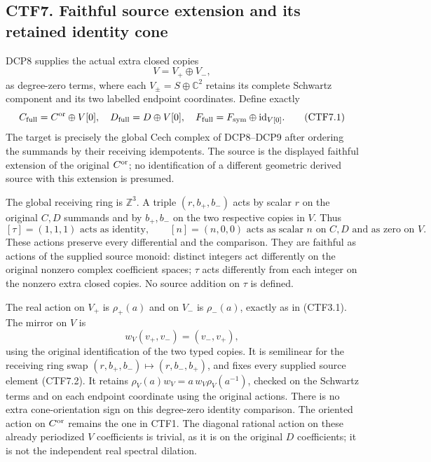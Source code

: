 \subsection{CTF7. Faithful source extension and its retained identity
cone}\label{ctf7.-faithful-source-extension-and-its-retained-identity-cone}

DCP8 supplies the actual extra closed copies \[
V=V_+\oplus V_-,
\] as degree-zero terms, where each \(V_\pm=S\oplus\mathbb C^2\) retains
its complete Schwartz component and its two labelled endpoint
coordinates. Define exactly \[
C_{\rm full}=C^{\rm or}\oplus V[0],\quad
D_{\rm full}=D\oplus V[0],\quad
F_{\rm full}=F_{\rm sym}\oplus\mathrm{id}_{V[0]}.
\tag{CTF7.1}
\] The target is precisely the global Cech complex of DCP8--DCP9 after
ordering the summands by their receiving idempotents. The source is the
displayed faithful extension of the original \(C^{\rm or}\); no
identification of a different geometric derived source with this
extension is presumed.

The global receiving ring is \(\mathbb Z^3\). A triple \((r,b_+,b_-)\)
acts by scalar \(r\) on the original \(C,D\) summands and by \(b_+,b_-\)
on the two respective copies in \(V\). Thus \[
[\tau]=(1,1,1)\text{ acts as identity},\qquad
[n]=(n,0,0)\text{ acts as scalar }n\text{ on }C,D
\text{ and as zero on }V.
\tag{CTF7.2}
\] These actions preserve every differential and the comparison. They
are faithful as actions of the supplied source monoid: distinct integers
act differently on the original nonzero complex coefficient spaces;
\(\tau\) acts differently from each integer on the nonzero extra closed
copies. No source addition on \(\tau\) is defined.

The real action on \(V_+\) is \(\rho_+(a)\) and on \(V_-\) is
\(\rho_-(a)\), exactly as in (CTF3.1). The mirror on \(V\) is \[
w_V(v_+,v_-)=(v_-,v_+),
\tag{CTF7.3}
\] using the original identification of the two typed copies. It is
semilinear for the receiving ring swap
\((r,b_+,b_-)\mapsto(r,b_-,b_+)\), and fixes every supplied source
element (CTF7.2). It retains \(\rho_V(a)w_V=a\,w_V\rho_V(a^{-1})\),
checked on the Schwartz terms and on each endpoint coordinate using the
original actions. There is no extra cone-orientation sign on this
degree-zero identity comparison. The oriented action on \(C^{\rm or}\)
remains the one in CTF1. The diagonal rational action on these already
periodized \(V\) coefficients is trivial, as it is on the original \(D\)
coefficients; it is not the independent real spectral dilation.

